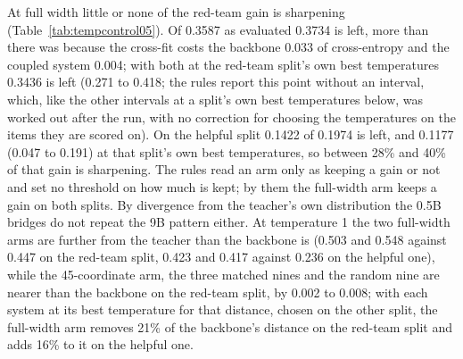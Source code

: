 \documentclass[11pt]{article}
\begin{document}
At full width little or none of the red-team gain is sharpening
(Table~\ref{tab:tempcontrol05}). Of 0.3587 as evaluated 0.3734 is left, more than
there was because the cross-fit costs the backbone 0.033 of cross-entropy and the
coupled system 0.004; with both at the red-team split's own best temperatures
0.3436 is left (0.271 to 0.418; the rules report this point without an interval,
which, like the other intervals at a split's own best temperatures below, was
worked out after the run, with no correction for choosing the temperatures on the
items they are scored on). On the helpful split 0.1422 of 0.1974 is left, and
0.1177 (0.047 to 0.191) at that split's own best temperatures, so between 28\% and
40\% of that gain is sharpening. The rules read an arm only as keeping a gain or
not and set no threshold on how much is kept; by them the full-width arm keeps a
gain on both splits. By divergence from the teacher's own distribution the 0.5B
bridges do not repeat the 9B pattern either. At temperature 1 the two full-width
arms are further from the teacher than the backbone is (0.503 and 0.548 against
0.447 on the red-team split, 0.423 and 0.417 against 0.236 on the helpful one),
while the 45-coordinate arm, the three matched nines and the random nine are
nearer than the backbone on the red-team split, by 0.002 to 0.008; with each
system at its best temperature for that distance, chosen on the other split, the
full-width arm removes 21\% of the backbone's distance on the red-team split and
adds 16\% to it on the helpful one.
\end{document}
